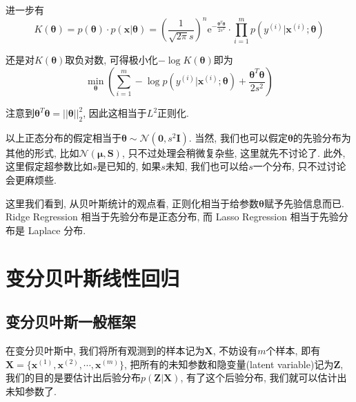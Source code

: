 \documentclass[a4paper,UTF8]{ctexart}
\theoremstyle{plain} \newtheorem{theorem}{定理}[section]
\theoremstyle{plain} \newtheorem{definition}{定义}[section]
\theoremstyle{plain} \newtheorem{lemma}{引理}[section]
\theoremstyle{plain} \newtheorem{proposition}{命题}[section]
\theoremstyle{plain} \newtheorem{example}{例}[section]
\theoremstyle{plain} \newtheorem{remark}{注}[section]
\theoremstyle{plain} \newtheorem{corollary}{推论}[section]
\begin{document}
进一步有
\begin{equation*}
K(\bm{\theta}) = p(\bm{\theta}) \cdot p(\bm{x | \theta}) = \left( \frac{1}{\sqrt{2 \pi} s} \right)^{n} \mathrm{e}^{-\frac{\bm{\theta}^{T} \bm{\theta}}{2s^2}} \cdot \prod_{i=1}^{m} p(y^{(i)}|\bm{x}^{(i)};\bm{\theta})
\end{equation*}

还是对$K(\bm{\theta})$取负对数, 可得极小化$- \log K(\bm{\theta})$即为
\begin{equation*}
\min_{\bm{\theta}} \left( \sum_{i=1}^{m} - \log p(y^{(i)}|\bm{x}^{(i)};\bm{\theta}) + \frac{\bm{\theta}^{T} \bm{\theta}}{2s^2} \right)
\end{equation*}

注意到$\bm{\theta}^{T} \bm{\theta} = ||\bm{\theta}||_{2}^{2}$, 因此这相当于$L^{2}$正则化.

以上正态分布的假定相当于$\bm{\theta} \sim \mathcal{N}(\bm{0}, s^{2}\bm{I})$. 当然, 我们也可以假定$\bm{\theta}$的先验分布为其他的形式, 比如$\mathcal{N}(\bm{\mu}, \bm{S})$, 只不过处理会稍微复杂些, 这里就先不讨论了. 此外, 这里假定超参数比如$s$是已知的, 如果$s$未知, 我们也可以给$s$一个分布, 只不过讨论会更麻烦些.

这里我们看到, 从贝叶斯统计的观点看, 正则化相当于给参数$\bm{\theta}$赋予先验信息而已. Ridge Regression 相当于先验分布是正态分布, 而 Lasso Regression 相当于先验分布是 Laplace 分布.


\section{变分贝叶斯线性回归}
\subsection{变分贝叶斯一般框架}
在变分贝叶斯中, 我们将所有观测到的样本记为$\bm{X}$, 不妨设有$m$个样本, 即有$\bm{X} = \{ \bm{x}^{(1)}, \bm{x}^{(2)}, \cdots, \bm{x}^{(m)} \}$, 把所有的未知参数和隐变量(latent variable)记为$\bm{Z}$, 我们的目的是要估计出后验分布$p(\bm{Z} | \bm{X})$, 有了这个后验分布, 我们就可以估计出未知参数了.
\end{document}
